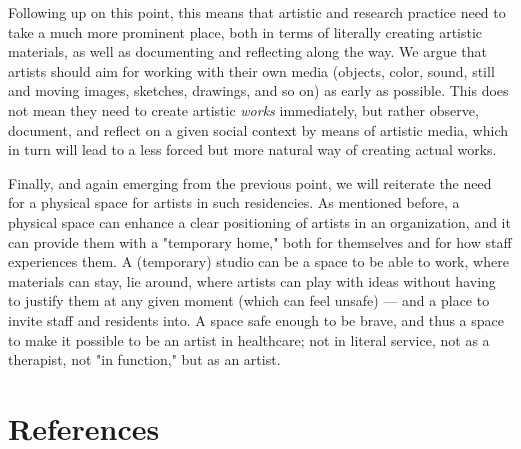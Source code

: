 \documentclass[authordate, empirical,issue]{jote-new-article}
\begin{document}
{	Following up on this point, this means that artistic and research practice need to take a much more prominent place, both in terms of literally creating artistic materials, as well as documenting and reflecting along the way. We argue that artists should aim for working with their own media (objects, color, sound, still and moving images, sketches, drawings, and so on) as early as possible. This does not mean they need to create artistic \emph{works} immediately, but rather observe, document, and reflect on a given social context by means of artistic media, which in turn will lead to a less forced but more natural way of creating actual works.







	Finally, and again emerging from the previous point, we will reiterate the need for a physical space for artists in such residencies. As mentioned before, a physical space can enhance a clear positioning of artists in an organization, and it can provide them with a "temporary home," both for themselves and for how staff experiences them. A (temporary) studio can be a space to be able to work, where materials can stay, lie around, where artists can play with ideas without having to justify them at any given moment (which can feel unsafe) — and a place to invite staff and residents into. A space safe enough to be brave, and thus a space to make it possible to be an artist in healthcare; not in literal service, not as a therapist, not "in function," but as an artist.

	}


	\section{References}
\end{document}
